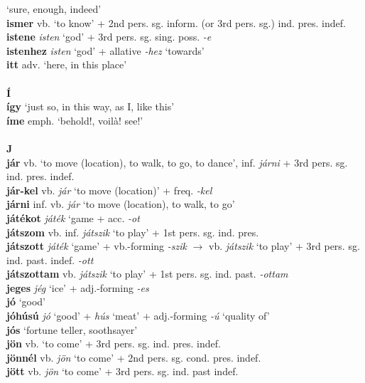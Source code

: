\documentclass[11pt]{article}
\begin{document}
`sure, enough, indeed' \\
\textbf{ismer} vb. `to know'  + 2nd pers. sg. inform. (or 3rd
pers. sg.) ind. pres. indef.\\
\textbf{istene} \emph{isten} `god' + 3rd
pers. sg. sing. poss. \emph{-e} \\
\textbf{istenhez} \emph{isten} `god' + allative \emph{-hez} `towards' \\
\textbf{itt} adv. `here, in this place' \\
\ \\
\noindent \textbf{\large Í} \\
\textbf{így} `just so, in this way, as I, like this' \\
\textbf{íme} emph. `behold!, voilà! see!' \\
\ \\
\noindent \textbf{\large J} \\
\textbf{jár} vb. `to move (location), to walk, to go, to dance',
inf. \emph{járni} + 3rd pers. sg. ind. pres. indef. \\
\textbf{jár-kel} vb. \emph{jár} `to move (location)' +
freq. \emph{-kel} \\
\textbf{járni} inf. vb. \emph{jár}  `to move (location), to walk, to
go' \\
\textbf{játékot} \emph{játék} `game + acc. \emph{-ot} \\
\textbf{játszom} vb. inf. \emph{játszik} `to play' + 1st
pers. sg. ind. pres. \\
\textbf{játszott} \emph{játék} `game' + vb.\hyp{}forming \emph{-szik}
$\rightarrow$ vb. \emph{játszik} `to play' +
3rd pers. sg. ind. past. indef. \emph{-ott} \\
\textbf{játszottam} vb. \emph{játszik} `to play' + 1st
pers. sg. ind. past. \emph{-ottam} \\
\textbf{jeges} \emph{jég} `ice' + adj.\hyp{}forming \emph{-es} \\
\textbf{jó} `good' \\
\textbf{jóhúsú} \emph{jó} `good' + \emph{hús} `meat' +
adj.\hyp{}forming \emph{-ú} `quality of' \\
\textbf{jós} `fortune teller, soothsayer' \\
\textbf{jön} vb. `to come' + 3rd pers. sg. ind. pres. indef. \\
\textbf{jönnél} vb. \emph{jön} `to come' + 2nd pers. sg.
cond. pres. indef. \\
\textbf{jött} vb. \emph{jön} `to come' + 3rd pers. sg. ind. past
indef. \\
\end{document}
